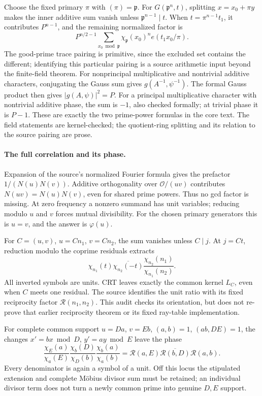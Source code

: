 Choose the fixed primary $\pi$ with $(\pi)=\mathfrak p$.
For $G(\mathfrak p^n,t)$, splitting $x=x_0+\pi y$ makes the
inner additive sum vanish unless $\mathfrak p^{n-1}\mid t$.
When $t=\pi^{n-1}t_1$, it contributes $P^{n-1}$, and the
remaining normalized factor is
\[
 P^{n/2-1}\sum_{x_0\bmod\mathfrak p}
          \chi_{\mathfrak p}(x_0)^n e(t_1x_0/\pi).
\]
The good-prime trace pairing is primitive, since the excluded set
contains the different; identifying this particular pairing is a source
arithmetic input beyond the finite-field theorem.
For nonprincipal multiplicative and nontrivial additive characters,
conjugating the Gauss sum gives $g(A^{-1},\psi^{-1})$.
The formal Gauss product then gives $|g(A,\psi)|^2=P$.
For a principal multiplicative character with nontrivial additive phase,
the sum is $-1$, also checked formally; at trivial phase it is $P-1$.
These are exactly the two prime-power formulas in the core text.
The field statements are kernel-checked; the quotient-ring splitting
and its relation to the source pairing are prose.

\paragraph{The full correlation and its phase.}
Expansion of the source's normalized Fourier formula gives the prefactor
$1/(N(u)N(v))$. Additive orthogonality over $\mathcal O/(uv)$
contributes $N(uv)=N(u)N(v)$, even for shared prime powers.
Thus no gcd factor is missing. At zero frequency a nonzero summand has
unit variables; reducing modulo $u$ and $v$ forces mutual divisibility.
For the chosen primary generators this is $u=v$, and the answer is
$\varphi(u)$.

For $C=(u,v)$, $u=Cn_1$, $v=Cn_2$, the sum vanishes unless $C\mid j$.
At $j=Ct$, reduction modulo the coprime residuals extracts
\[
 \chi_{n_1}(t)\overline{\chi_{n_2}(-t)}
 \frac{\chi_{n_2}(n_1)}{\chi_{n_1}(n_2)}.
\]
All inverted symbols are units. CRT leaves exactly the common kernel
$L_C$, even when $C$ meets one residual. The source identifies the
unit ratio with its fixed reciprocity factor $\mathcal R(n_1,n_2)$.
This audit checks its orientation, but does not re-prove that earlier
reciprocity theorem or its fixed ray-table implementation.

For complete common support $u=Da$, $v=Eb$, $(a,b)=1$,
$(ab,DE)=1$, the changes $x'=bx\bmod D$, $y'=ay\bmod E$
leave the phase
\[
 \frac{\chi_E(a)}{\chi_a(E)}
 \frac{\chi_b(D)}{\chi_D(b)}
 \frac{\chi_b(a)}{\chi_a(b)}
 =\mathcal R(a,E)\overline{\mathcal R(b,D)}\mathcal R(a,b).
\]
Every denominator is again a symbol of a unit. Off this locus the
stipulated extension and complete M\"obius divisor sum must be retained;
an individual divisor term does not turn a newly common prime into
genuine $D,E$ support.


